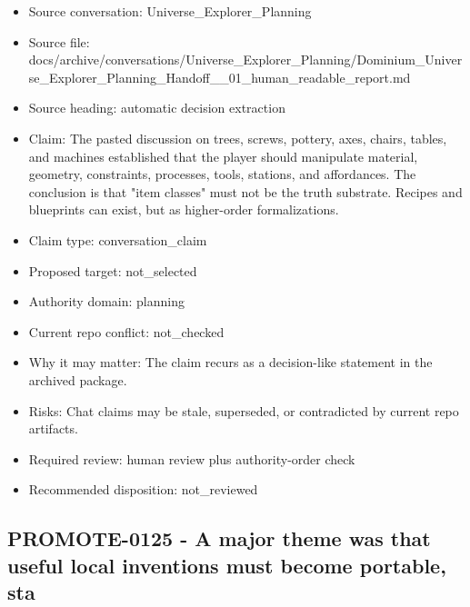 \documentclass[11pt,a4paper]{report}
\begin{document}
\begin{itemize}
\item Source conversation: Universe\_Explorer\_Planning
\item Source file: docs/archive/conversations/Universe\_Explorer\_Planning/Dominium\_Universe\_Explorer\_Planning\_Handoff\_\_01\_human\_readable\_report.md
\item Source heading: automatic decision extraction
\item Claim: The pasted discussion on trees, screws, pottery, axes, chairs, tables, and machines established that the player should manipulate material, geometry, constraints, processes, tools, stations, and affordances. The conclusion is that "item classes" must not be the truth substrate. Recipes and blueprints can exist, but as higher-order formalizations.
\item Claim type: conversation\_claim
\item Proposed target: not\_selected
\item Authority domain: planning
\item Current repo conflict: not\_checked
\item Why it may matter: The claim recurs as a decision-like statement in the archived package.
\item Risks: Chat claims may be stale, superseded, or contradicted by current repo artifacts.
\item Required review: human review plus authority-order check
\item Recommended disposition: not\_reviewed
\end{itemize}

\subsection{PROMOTE-0125 - A major theme was that useful local inventions must become portable, sta}
\end{document}
